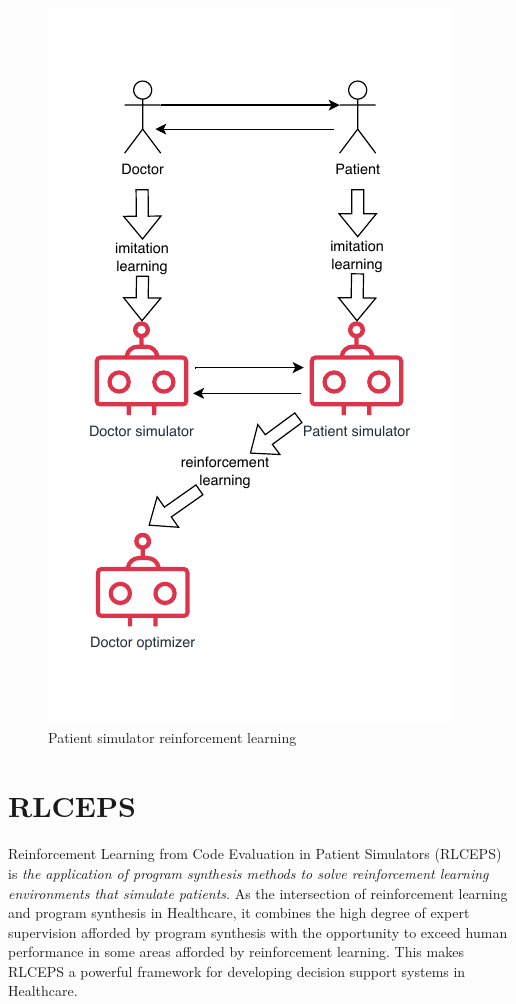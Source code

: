 \begin{figure}
  \centering
  \includegraphics[width=0.9\linewidth]{images/rlceps.pdf}
  \caption{Patient simulator reinforcement learning}
  \label{fig:RLCEPS}
\end{figure}

\newpage
\section{RLCEPS}
\label{sec:patient-sRLCEF}

\begin{highlight}
Reinforcement Learning from Code Evaluation in Patient Simulators (RLCEPS) is \emph{the application of program synthesis methods to solve reinforcement learning environments that simulate patients}.
As the intersection of reinforcement learning and program synthesis in Healthcare, it combines the high degree of expert supervision afforded by program synthesis with the opportunity to exceed human performance in some areas afforded by reinforcement learning.
This makes RLCEPS a powerful framework for developing decision support systems in Healthcare.
\end{highlight}